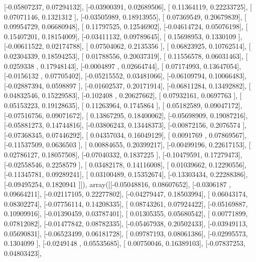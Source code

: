 \documentclass{article}
\begin{document}
       [-0.05807237,  0.07294132],
       [-0.03900391,  0.02689506],
       [ 0.11364119,  0.22233725],
       [ 0.07071146,  0.1321312 ],
       [-0.03505989,  0.18913955],
       [ 0.07369549,  0.20679839],
       [ 0.09954729,  0.06680948],
       [ 0.11797525,  0.12546902],
       [-0.04614724,  0.05076198],
       [ 0.15407201,  0.18154009],
       [-0.03411132,  0.09789645],
       [ 0.15698953,  0.1330109 ],
       [-0.00611522,  0.02174788],
       [ 0.07504062,  0.2135356 ],
       [ 0.06823925,  0.10762514],
       [ 0.02304339,  0.18594253],
       [ 0.01788556,  0.20037319],
       [ 0.11556578,  0.06031463],
       [ 0.0259338 ,  0.17948143],
       [-0.0004897 ,  0.02664744],
       [ 0.07174993,  0.13647054],
       [-0.0156132 ,  0.07705402],
       [-0.05215552,  0.03481066],
       [-0.06109794,  0.10066483],
       [-0.02887394,  0.0598897 ],
       [-0.01602537,  0.20171914],
       [-0.06811284,  0.13492882],
       [ 0.04832546,  0.15229583],
       [-0.102408  ,  0.20627662],
       [ 0.07932161,  0.0697763 ],
       [ 0.05153223,  0.19128635],
       [ 0.11263964,  0.1745864 ],
       [ 0.05182589,  0.09047172],
       [-0.07516756,  0.09071672],
       [ 0.13867295,  0.18400062],
       [-0.05698909,  0.19087216],
       [-0.05881273,  0.14744816],
       [-0.03806243,  0.13448373],
       [-0.00872156,  0.2076574 ],
       [-0.07368345,  0.07446292],
       [ 0.04357034,  0.16049129],
       [ 0.0091769 ,  0.07869567],
       [-0.11537509,  0.0636503 ],
       [ 0.00884655,  0.20399217],
       [-0.00499196,  0.22617153],
       [ 0.02786127,  0.18057508],
       [-0.07040332,  0.1837225 ],
       [-0.10479591,  0.17279473],
       [-0.02558546,  0.2258579 ],
       [ 0.03482178,  0.14116008],
       [ 0.01039662,  0.12290556],
       [-0.11345781,  0.09289241],
       [ 0.03100489,  0.15352674],
       [-0.13303434,  0.22288386],
       [-0.09495254,  0.1820941 ]]), array([[-0.05048816,  0.08607652],
       [-0.0306187 ,  0.09664211],
       [-0.02117105,  0.22277802],
       [-0.04279447,  0.18503994],
       [ 0.06043174,  0.08302274],
       [-0.07756114,  0.14208335],
       [ 0.08743261,  0.07924422],
       [-0.05169887,  0.10909916],
       [-0.01390459,  0.03787401],
       [ 0.01305355,  0.05680542],
       [ 0.00771899,  0.07812082],
       [-0.01477842,  0.08782335],
       [-0.05467938,  0.20502433],
       [-0.03949113,  0.05690831],
       [-0.06523499,  0.06181728],
       [ 0.09787193,  0.08061386],
       [-0.02995573,  0.1304099 ],
       [-0.0249148 ,  0.05535685],
       [ 0.00750046,  0.16389103],
       [-0.07837253,  0.04803423],
\end{document}

